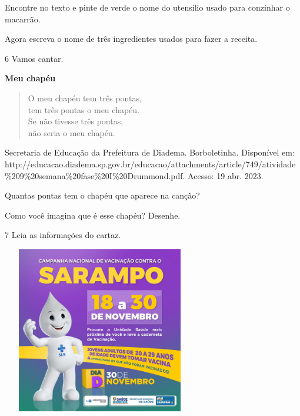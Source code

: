 {{{\begin{escolha}
	\item Encontre no texto e pinte de verde o nome do utensílio usado para
conzinhar o macarrão.


	\item Agora escreva o nome de três ingredientes usados para fazer a
receita.

\end{escolha}

\num{6} Vamos cantar.

\textbf{Meu chapéu}

\begin{verse}
O meu chapéu tem três pontas,\\
tem três pontas o meu chapéu.\\
Se não tivesse três pontas,\\
não seria o meu chapéu.
\end{verse}

Secretaria de Educação da Prefeitura de Diadema. Borboletinha. Disponível em: http://educacao.diadema.sp.gov.br/educacao/attachments/article/749/atividade\%209\%20semana\%20fase\%20I\%20Drummond.pdf. Acesso: 19 abr. 2023. 

\begin{escolha}
	\item Quantas pontas tem o chapéu que aparece na canção?


	\item Como você imagina que é esse chapéu? Desenhe.


\end{escolha}

\num{7} Leia as informações do cartaz.


\includegraphics[width=3.36943in,height=2.86363in]{media/image85.jpeg}

}}}
